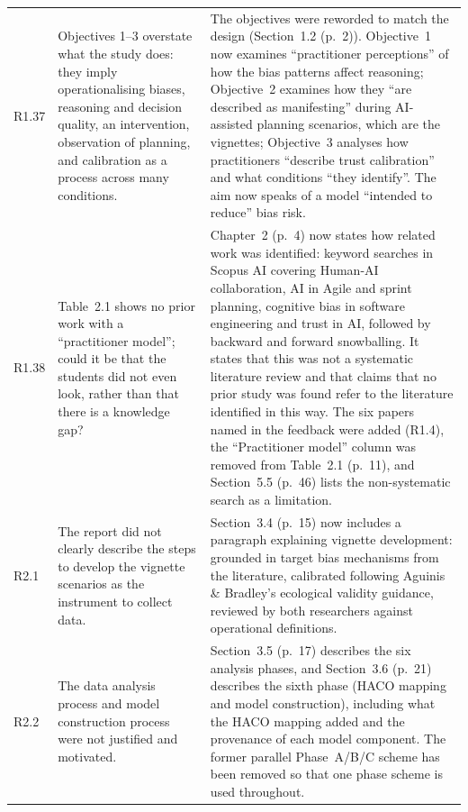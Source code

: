 \documentclass[12pt,a4paper,twoside]{article}
\begin{document}
{\begin{longtable}{p{1cm}p{6.7cm}p{7cm}}
R1.37 &
Objectives 1--3 overstate what the study does: they imply operationalising biases, reasoning and decision quality, an intervention, observation of planning, and calibration as a process across many conditions. &
The objectives were reworded to match the design (Section~1.2 (p.~2)). Objective~1 now examines ``practitioner perceptions'' of how the bias patterns affect reasoning; Objective~2 examines how they ``are described as manifesting'' during AI-assisted planning scenarios, which are the vignettes; Objective~3 analyses how practitioners ``describe trust calibration'' and what conditions ``they identify''. The aim now speaks of a model ``intended to reduce'' bias risk. \\

R1.38 &
Table~2.1 shows no prior work with a ``practitioner model''; could it be that the students did not even look, rather than that there is a knowledge gap? &
Chapter~2 (p.~4) now states how related work was identified: keyword searches in Scopus AI covering Human-AI collaboration, AI in Agile and sprint planning, cognitive bias in software engineering and trust in AI, followed by backward and forward snowballing. It states that this was not a systematic literature review and that claims that no prior study was found refer to the literature identified in this way. The six papers named in the feedback were added (R1.4), the ``Practitioner model'' column was removed from Table~2.1 (p.~11), and Section~5.5 (p.~46) lists the non-systematic search as a limitation. \\

R2.1 &
The report did not clearly describe the steps to develop the vignette scenarios as the
instrument to collect data. &
Section~3.4 (p.~15) now includes a paragraph explaining vignette development: grounded in
target bias mechanisms from the literature, calibrated following Aguinis \& Bradley's
ecological validity guidance, reviewed by both researchers against operational
definitions. \\

R2.2 &
The data analysis process and model construction process were not justified and
motivated. &
Section~3.5 (p.~17) describes the six analysis phases, and Section~3.6 (p.~21) describes the sixth phase (HACO mapping and model construction), including what the HACO mapping added and the provenance of each model component. The former parallel Phase~A/B/C scheme has been removed so that one phase scheme is used throughout. \\


\end{longtable}}
\end{document}
